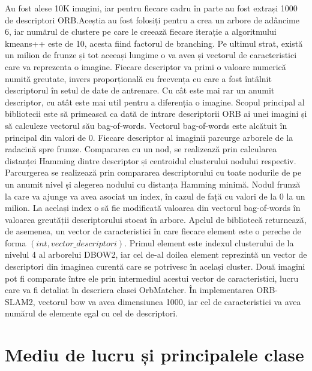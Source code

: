 \documentclass[12pt,a4paper]{report}
\begin{document}
Au fost alese 10K imagini, iar pentru fiecare cadru în parte au fost extrași 1000 de descriptori ORB.\@ Aceștia au 
fost folosiți pentru a crea un arbore de adâncime 6, iar numărul de clustere pe care le creează fiecare 
iterație a algoritmului kmeans++ este de 10, acesta fiind factorul de branching. Pe ultimul strat, există un milion 
de frunze și tot aceeași lungime o va avea și vectorul de caracteristici care va reprezenta o imagine. Fiecare
descriptor va primi o valoare numerică numită greutate, invers proporțională cu frecvența cu care a fost 
întâlnit descriptorul în setul de date de antrenare. Cu cât este mai rar un anumit descriptor, cu atât este
mai util pentru a diferenția o imagine. Scopul principal al bibliotecii este să primească ca dată
de intrare descriptorii ORB ai unei imagini și să calculeze vectorul său bag-of-words.
Vectorul bag-of-words este alcătuit în principal din valori de 0. Fiecare descriptor al 
imaginii parcurge arborele de la radacină spre frunze. Compararea cu un nod, se realizează 
prin calcularea distanței Hamming dintre descriptor și centroidul clusterului nodului respectiv.
Parcurgerea se realizează prin compararea descriptorului cu toate nodurile de pe un anumit nivel
și alegerea nodului cu distanța Hamming minimă. Nodul frunză la care va ajunge va avea asociat
un index, în cazul de față cu valori de la 0 la un milion. La același index o să fie modificată
valoarea din vectorul bag-of-words în valoarea greutății descriptorului stocat în arbore.
Apelul de bibliotecă returnează, de asemenea, un vector de caracteristici în care fiecare element
este o pereche de forma $ (int, vector\_descriptori) $. Primul element este indexul 
clusterului de la nivelul 4 al arborelui DBOW2, iar cel de-al doilea element reprezintă un 
vector de descriptori din imaginea curentă care se potrivesc în același cluster. Două imagini pot
fi comparate între ele prin intermediul acestui vector de caracteristici, lucru care va fi detaliat
în descriera clasei OrbMatcher. În implementarea ORB-SLAM2, vectorul bow va avea dimensiunea 1000,
iar cel de caracteristici va avea numărul de elemente egal cu cel de descriptori.

\section{Mediu de lucru și principalele clase}
\end{document}

